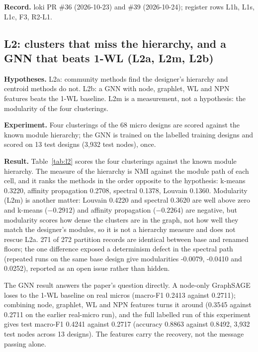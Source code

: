 \documentclass[conference]{IEEEtran}
\newcommand{\hev}[1]{\par\smallskip\noindent\textbf{#1}}
\begin{document}
\hev{Record.} loki PR \#36 (2026-10-23) and \#39 (2026-10-24); register rows L1h, L1s, L1c, F3, R2-L1.

\subsection{L2: clusters that miss the hierarchy, and a GNN that beats 1-WL (L2a, L2m, L2b)}
\label{sec:l2-results}

\hev{Hypotheses.} L2a: community methods find the designer's hierarchy and centroid methods do
not. L2b: a GNN with node, graphlet, WL and NPN features beats the 1-WL baseline. L2m is a
measurement, not a hypothesis: the modularity of the four clusterings.

\hev{Experiment.} Four clusterings of the 68 micro designs are scored against the known module
hierarchy; the GNN is trained on the labelled training designs and scored on 13 test designs
(3,932 test nodes), once.

\hev{Result.} 
Table~\ref{tab:l2} scores the four clusterings against the known module hierarchy. The measure
of the hierarchy is NMI against the module path of each cell, and it ranks the methods in the
order opposite to the hypothesis: k-means 0.3220, affinity propagation 0.2708, spectral 0.1378,
Louvain 0.1360. Modularity (L2m) is another matter: Louvain 0.4220 and spectral 0.3620 are
well above zero and k-means ($-0.2912$) and affinity propagation ($-0.2264$) are negative, but modularity
scores how dense the clusters are in the graph, not how well they match the designer's modules,
so it is not a hierarchy measure and does not rescue L2a. 271 of 272 partition records are identical
between base and renamed floors; the one difference exposed a determinism defect in the
spectral path (repeated runs on the same base design give modularities -0.0079, -0.0410 and
0.0252), reported as an open issue rather than hidden.

The GNN result answers the paper's question directly. A node-only GraphSAGE loses to the
1-WL baseline on real micros (macro-F1 0.2413 against 0.2711); combining node, graphlet, WL
and NPN features turns it around (0.3545 against 0.2711 on the earlier real-micro run), and
the full labelled run of this experiment gives test macro-F1 0.4241 against 0.2717
(accuracy 0.8863 against 0.8492, 3,932 test nodes across 13 designs). The features carry the
recovery, not the message passing alone.
\end{document}
